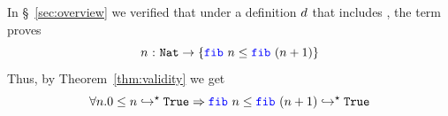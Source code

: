 

%
In \S~\ref{sec:overview} we verified that
under a definition $d$ that includes \fibname,
the term \fibincrname proves
$${\tfun{n}{\tnat}{\ttref{\fib{n} \leq \fib{(n+1)}}}}$$
%
Thus, by Theorem~\ref{thm:validity} we get
%
$$
\forall n. \evalsto{0 \leq n}{\etrue} \Rightarrow \evalsto{\fib{n} \leq \fib{(n+1)}}{\etrue}
$$
